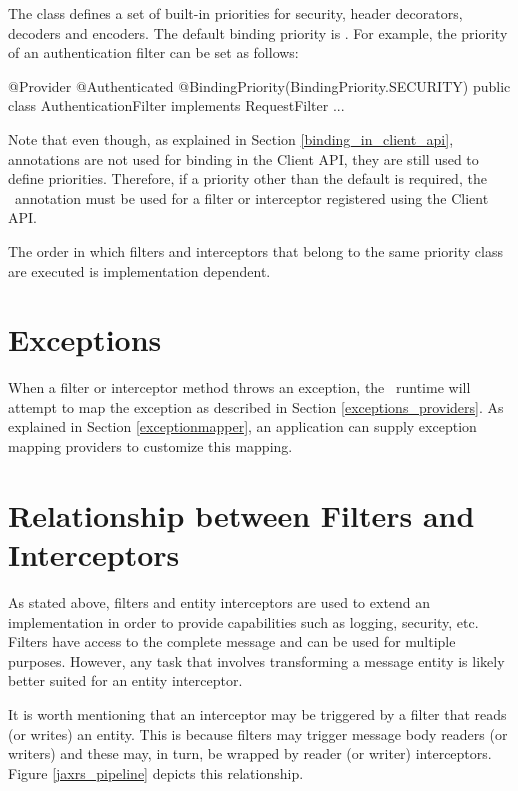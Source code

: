 The  class defines a set of built-in priorities for security, header decorators, decoders and encoders. The default binding priority is . For example, the priority of an authentication filter can be set as follows:

\begin{listing}{1}
@Provider
@Authenticated
@BindingPriority(BindingPriority.SECURITY)
public class AuthenticationFilter implements RequestFilter {
    ...
}
\end{listing}

Note that even though, as explained in Section \ref{binding_in_client_api}, annotations are not used for binding in the Client API, they are still used to define priorities. Therefore, if a priority other than the default is required, the \BindingPriority\ annotation must be used for a filter or interceptor registered using the Client API. 

The order in which filters and interceptors that belong to the same priority class are executed is implementation dependent.

\section{Exceptions}
\label{exceptions_filters_and_interceptors}

When a filter or interceptor method throws an exception, the \jaxrs\ runtime will attempt to map the exception as described in Section \ref{exceptions_providers}.  As explained in Section \ref{exceptionmapper}, an application can supply exception mapping providers to customize this mapping.

\section{Relationship between Filters and Interceptors}

As stated above, filters and entity interceptors are used to extend an implementation in order to provide capabilities such as logging, security, etc. Filters have access to the complete message and can be used for multiple purposes. However, any task that involves transforming a message entity is likely better suited for an entity interceptor. 

It is worth mentioning that an interceptor may be triggered by a filter that reads (or writes) an entity. This is 
because filters may trigger message body readers (or writers) and these may, in turn, be wrapped by reader (or writer) interceptors. Figure \ref{jaxrs_pipeline} depicts this relationship. 

